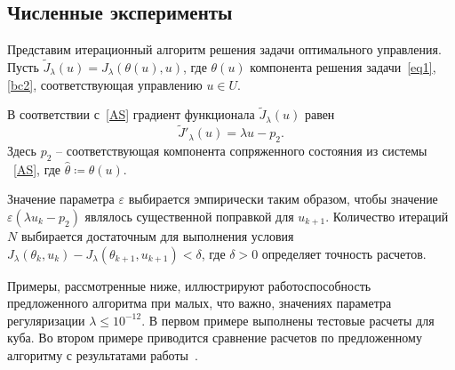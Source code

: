 \subsection{Численные эксперименты}

Представим итерационный алгоритм решения задачи оптимального управления.
Пусть $\tilde J_\lambda(u)=J_\lambda(\theta(u), u)$, где $\theta(u)$ компонента решения
задачи~\eqref{eq1},\eqref{bc2}, соответствующая управлению $u\in U$.

В соответствии с~\eqref{AS} градиент функционала $\tilde J_\lambda(u)$ равен
\[ \tilde J'_\lambda (u) = \lambda u - p_2. \]
Здесь $p_2$ -- соответствующая компонента сопряженного состояния из системы ~\eqref{AS},
где $\hat{\theta}\coloneqq\theta(u)$.

Значение параметра $\varepsilon$ выбирается эмпирически таким образом, чтобы значение
$\varepsilon (\lambda u_k - p_2)$ являлось существенной поправкой для $u_{k+1}$.
Количество итераций $N$ выбирается достаточным для выполнения условия
$J_\lambda(\theta_k, u_k) - J_\lambda(\theta_{k+1}, u_{k+1}) < \delta$, где $\delta>0$
определяет точность расчетов.

Примеры, рассмотренные ниже, иллюстрируют работоспособность предложенного алгоритма при
малых, что важно, значениях параметра регуляризации $\lambda \leq 10^{-12}$.
В первом примере выполнены тестовые расчеты для куба.
Во втором примере приводится сравнение расчетов по
предложенному алгоритму с результатами работы~\cite{CNSNS19}.


